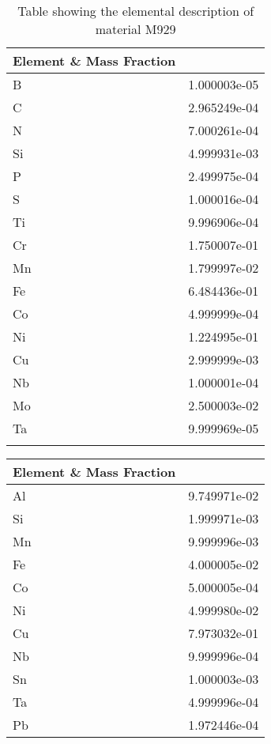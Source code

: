 \begin{centering}
\begin{longtable}[ht!]
\caption{Table showing the elemental description of material M933}
\label{table:material_EPTRAP}
\end{longtable}
\clearpage
\begin{longtable}[ht!]
{ p{} | p{} }
\hline
Element \& Mass Fraction\\
\hline
B &  1.000003e-05\\
C &  2.965249e-04\\
N &  7.000261e-04\\
Si &  4.999931e-03\\
P &  2.499975e-04\\
S &  1.000016e-04\\
Ti &  9.996906e-04\\
Cr &  1.750007e-01\\
Mn &  1.799997e-02\\
Fe &  6.484436e-01\\
Co &  4.999999e-04\\
Ni &  1.224995e-01\\
Cu &  2.999999e-03\\
Nb &  1.000001e-04\\
Mo &  2.500003e-02\\
Ta &  9.999969e-05\\
\caption{Table showing the elemental description of material M929}
\label{table:material_PPWater}
\end{longtable}
\clearpage
\begin{longtable}[ht!]
  { p{} | p{} }
\hline
Element \& Mass Fraction\\
\hline
Al &  9.749971e-02\\
Si &  1.999971e-03\\
Mn &  9.999996e-03\\
Fe &  4.000005e-02\\
Co &  5.000005e-04\\
Ni &  4.999980e-02\\
Cu &  7.973032e-01\\
Nb &  9.999996e-04\\
Sn &  1.000003e-03\\
Ta &  4.999996e-04\\
Pb &  1.972446e-04\\


\end{longtable}
\end{centering}
